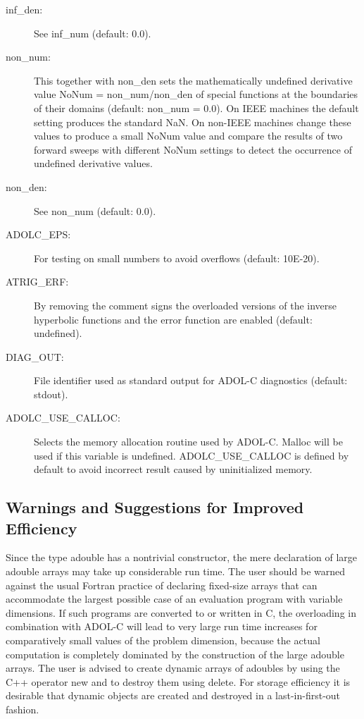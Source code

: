 \documentclass[11pt,twoside]{article}
\begin{document}
\begin{description}
\item[{\sf inf\_den}{\rm :}] See {\sf inf\_num} (default: 0.0).

\item[{\sf non\_num}{\rm :}] This together with {\sf non\_den} 
sets the mathematically 
undefined derivative value {\sf NoNum} = {\sf non\_num/non\_den}
of special functions at the boundaries of their domains (default: {\sf non\_num} = 0.0). On IEEE machines
the default setting produces the standard {\sf NaN}. On non-IEEE machines
change these values to produce a small {\sf NoNum} value and compare
the results of two forward sweeps with different {\sf NoNum} settings
to detect the occurrence of undefined derivative values.

\item[{\sf non\_den}{\rm :}] See {\sf non\_num} (default: 0.0).

\item[{\sf ADOLC\_EPS}{\rm :}] For testing on small numbers to avoid overflows (default: 10E-20).

\item[{\sf ATRIG\_ERF}{\rm :}] By removing the comment signs 
the overloaded versions of the inverse hyperbolic functions and 
the error function are enabled (default: undefined).

\item[{\sf DIAG\_OUT}{\rm :}] File identifier used as standard output for ADOL-C diagnostics (default: stdout).

\item[{\sf ADOLC\_USE\_CALLOC}{\rm :}] Selects the memory allocation routine
  used by ADOL-C. {\sf Malloc} will be used if this variable is
  undefined. {\sf ADOLC\_USE\_CALLOC} is defined by default to avoid incorrect
  result caused by uninitialized memory. 
\end{description}
%
\subsection{Warnings and Suggestions for Improved Efficiency}
\label{WarSug}
%
Since the type {\sf adouble} has a nontrivial constructor,
the mere declaration of large {\sf adouble} arrays may take up
considerable run time. The user should be warned against
the usual Fortran practice of declaring fixed-size arrays
that can accommodate the largest possible case of an evaluation program
with variable dimensions. If such programs are converted to or written
in C, the overloading in combination with ADOL-C will lead to very
large run time increases for comparatively small values of the
problem dimension, because the actual computation is completely
dominated by the construction of the large {\sf adouble} arrays.
The user is advised to 
create dynamic arrays of
{\sf adouble}s by using the C++ operator {\sf new} and to destroy them
using {\sf delete}. For storage efficiency it is desirable that
dynamic objects are created and destroyed in a last-in-first-out
fashion. 
\end{document}
